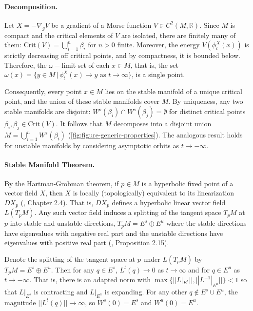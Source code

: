 \documentclass[12pt]{article}
\newcommand\colorAutoref[1]{{\hypersetup{linkcolor=blue}\autoref{#1}}}  %
\begin{document}
\paragraph{Decomposition.} Let $X = -\nabla_g V$ be a gradient of a Morse function $V \in C^2(M, \mathbb{R})$. Since $M$ is compact and the critical elements of $V$ are isolated, there are finitely many of them: $\text{Crit}(V) = \bigcup_{i=1}^n\beta_i$ for $n>0$ finite. Moreover, the energy $V(\phi^X_t(x))$ is strictly decreasing off critical points, and by compactness, it is bounded below. Therefore, the $\omega-$limit set of each $x\in M$, that is, the set $\omega(x)=\{y \in M \, | \, \phi_t^X(x) \rightarrow y \text{ as }t\rightarrow \infty \}$, is a single point. 

Consequently, every point $x\in M$ lies on the stable manifold of a unique critical point, and the union of these stable manifolds cover $M$. By uniqueness, any two stable manifolds are disjoint: $W^s(\beta_i) \cap W^s(\beta_j) = \emptyset$ for distinct critical points $\beta_i,\beta_j \in \text{Crit}(V)$. It follows that $M$ decomposes into a disjoint union $M = \bigcup_{i=1}^n W^s(\beta_i)$ (\colorAutoref{fig:figure-generic-properties}). The analogous result holds for unstable manifolds by considering asymptotic orbits as $t\rightarrow -\infty$.

\paragraph{Stable Manifold Theorem.} By the Hartman-Grobman theorem, if $p \in M$ is a hyperbolic fixed point of a vector field $X$, then $X$ is locally (topologically) equivalent to its linearization $DX_p$ (\cite{palis2012geometric}, Chapter 2.4). That is, $DX_p$ defines a hyperbolic linear vector field $L(T_pM)$. Any such vector field induces a splitting of the tangent space $T_pM$ at $p$ into stable and unstable directions, $T_pM = E^s \oplus E^u$ where the stable directions have eigenvalues with negative real part and the unstable directions have eigenvalues with positive real part (\cite{palis2012geometric}, Proposition 2.15).

Denote the splitting of the tangent space at $p$ under $L(T_pM)$ by $T_pM = E^s \oplus E^u$. Then for any $q \in E^s$, $L^t(q) \rightarrow 0$ as $t \rightarrow \infty$ and for $q \in E^u$ as $t \rightarrow -\infty$. That is, there is an adapted norm with $\max{\{|| L|_{E^s}||,|| L^{-1}|_{E^u}|| \}}<1$ so that $L|_{E^s}$ is contracting and $L|_{E^u}$ is expanding. For any other $q \notin E^s \cup E^u$, the magnitude $|| L^t(q) || \rightarrow \infty$, so $W^s(0) = E^s$ and $W^u(0)=E^u$. 
\end{document}

